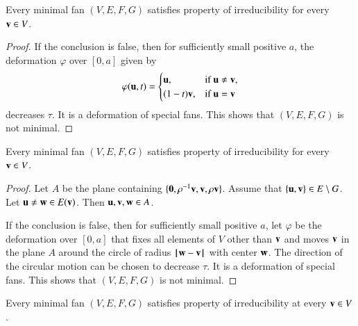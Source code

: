 \begin{lemma}
Every minimal fan $(V,E,F,G)$ satisfies property  of irreducibility  for
every ${\mathbf v}\in V$.
\end{lemma}

\begin{proof} If the conclusion is false, then for sufficiently small positive $a$,  the deformation $\varphi$ over $[0,a]$ given by
$$
\varphi({\mathbf u},t) =
\begin{cases}
{\mathbf u}, & \text{if }{\mathbf u} \ne {\mathbf v},\\
(1-t) {\mathbf v}, & \text{if }{\mathbf u} = {\mathbf v}\\
\end{cases}
$$
decreases $\tau$.  It is a deformation of special fans.  This shows that $(V,E,F,G)$ is not minimal.
\end{proof}

\begin{lemma}   %
Every minimal fan $(V,E,F,G)$ satisfies property  of irreducibility  for
every ${\mathbf v}\in V$.
\end{lemma}

\begin{proof} 
Let $A$ be the plane containing $\{{\mathbf 0},\rho^{-1}{\mathbf v},{\mathbf v},\rho{\mathbf v}\}$.  Assume that $\{{\mathbf u},{\mathbf v}\}\in E\setminus G$.  Let ${\mathbf u}\ne {\mathbf w}\in E({\mathbf v})$.  Then ${\mathbf u},{\mathbf v},{\mathbf w}\in A$. 

If the conclusion is false, then for sufficiently small positive $a$, let $\varphi$ be the  deformation over $[0,a]$ that fixes all elements of $V$ other than ${\mathbf v}$ and moves ${\mathbf v}$ in the plane $A$ around the circle of radius ${\hskip0.1em|\hskip-0.15em|\hskip0.1em}{\mathbf w} - {\mathbf v}{\hskip0.1em|\hskip-0.15em|\hskip0.1em}$ with center ${\mathbf w}$.  The direction of the circular motion can be chosen to decrease $\tau$.  It is a deformation of special fans.  This shows that $(V,E,F,G)$ is not minimal.
\end{proof}

\begin{lemma}
Every minimal fan $(V,E,F,G)$ satisfies property 
of irreducibility at every ${\mathbf v}\in V$.
\end{lemma}

